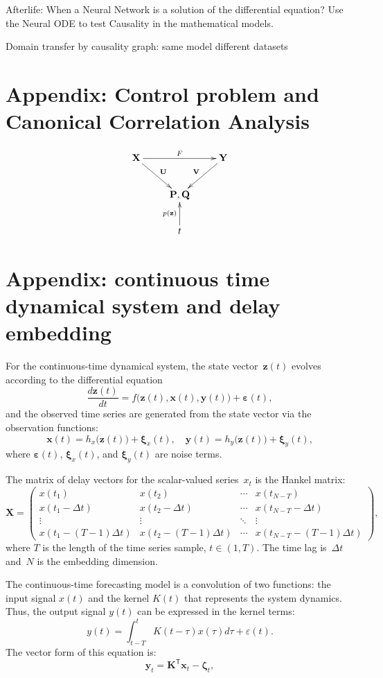 \documentclass[12pt]{article}
\begin{document}
Afterlife: When a Neural Network is a solution of the differential equation?
Use the Neural ODE to test Causality in the mathematical models.

Domain transfer by causality graph: same model different datasets


\section{Appendix: Control problem and Canonical Correlation Analysis}
\begin{equation*}
    \xymatrix{
        \mathbf{X} \ar "1,3"^{F} \ar "2,2" ^{\mathbf{U}} & ~  & \mathbf{Y} \ar "2,2"_{\mathbf{V}}  \\
        ~ & \mathbf{P},\mathbf{Q}  & ~ \\
        ~ & t \ar "2,2"^{p(\mathbf{z})} & ~
    }
\end{equation*}

\section{Appendix: continuous time dynamical system and delay embedding}
For the continuous-time dynamical system, the state vector~$\mathbf{z}(t)$ evolves according to the differential equation
\[
    \frac{d\mathbf{z}(t)}{dt} = f\bigl(\mathbf{z}(t), \mathbf{x}(t), \mathbf{y}(t)\bigr)  + \boldsymbol{\varepsilon}(t),
\]
and the observed time series are generated from the state vector via the observation functions:
\[
    \mathbf{x}(t) = h_x\bigl(\mathbf{z}(t)\bigr) + \boldsymbol{\xi}_x(t), \quad
    \mathbf{y}(t) = h_y\bigl(\mathbf{z}(t)\bigr) + \boldsymbol{\xi}_y(t),
\]
where $\boldsymbol{\varepsilon}(t)$, $\boldsymbol{\xi}_x(t)$, and $\boldsymbol{\xi}_y(t)$ are noise terms.

The matrix of delay vectors for the scalar-valued series~$x_t$ is the Hankel matrix:
 \[
     \mathbf{X} = \begin{pmatrix} x(t_1) & x(t_2) & \cdots & x(t_{N-T}) \\ x(t_1 - \Delta t) & x(t_2 - \Delta t) & \cdots & x(t_{N-T} - \Delta t) \\ \vdots & \vdots & \ddots & \vdots \\ x(t_1 - (T-1)\Delta t) & x(t_2 - (T-1)\Delta t) & \cdots & x(t_{N-T} - (T-1)\Delta t) \end{pmatrix},
 \]
where $T$ is the length of the time series sample, $t\in(1,T)$.
The time lag is~$\Delta t$ and~$N$ is the embedding dimension.

The continuous-time forecasting model is a convolution of two functions: the input signal $x(t)$ and the kernel $K(t)$ that represents the system dynamics.
Thus, the output signal $y(t)$ can be expressed
in the kernel terms:
\[
y(t) = \int_{t-T}^{t} K(t - \tau) x(\tau) d\tau + \varepsilon(t).
\]
The vector form of this equation is:
\[
\mathbf{y}_t = \mathbf{K}^\mathsf{T} \mathbf{x}_t - \boldsymbol{\zeta}_t ,
\]
\end{document}
